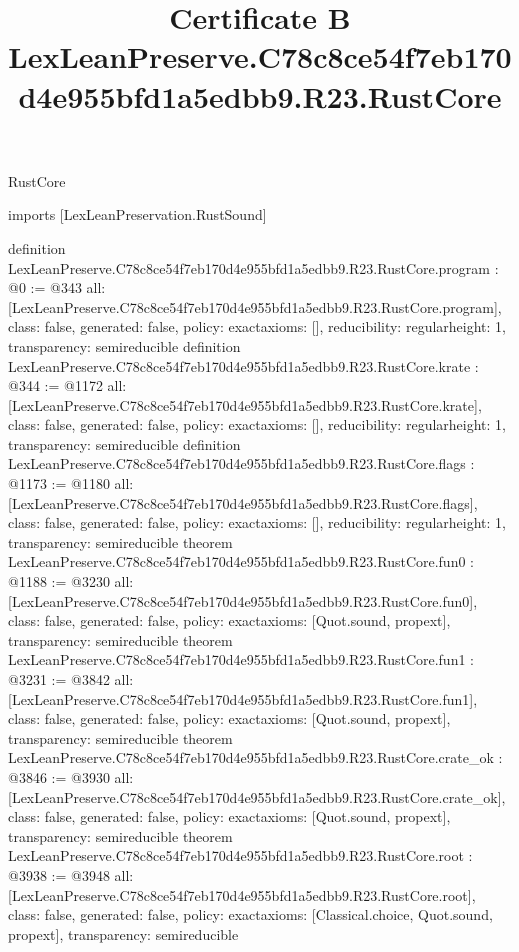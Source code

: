 \begin{lexlean}{RustCore}
\title{Certificate B LexLeanPreserve.C78c8ce54f7eb170d4e955bfd1a5edbb9.R23.RustCore}
\begin{coremodule}
imports [LexLeanPreservation.RustSound]

definition LexLeanPreserve.C78c8ce54f7eb170d4e955bfd1a5edbb9.R23.RustCore.program : @0 := @343 {
  all: [LexLeanPreserve.C78c8ce54f7eb170d4e955bfd1a5edbb9.R23.RustCore.program],
  class: false,
  generated: false,
  policy: exact{axioms: []},
  reducibility: regular{height: 1},
  transparency: semireducible
}
definition LexLeanPreserve.C78c8ce54f7eb170d4e955bfd1a5edbb9.R23.RustCore.krate : @344 := @1172 {
  all: [LexLeanPreserve.C78c8ce54f7eb170d4e955bfd1a5edbb9.R23.RustCore.krate],
  class: false,
  generated: false,
  policy: exact{axioms: []},
  reducibility: regular{height: 1},
  transparency: semireducible
}
definition LexLeanPreserve.C78c8ce54f7eb170d4e955bfd1a5edbb9.R23.RustCore.flags : @1173 := @1180 {
  all: [LexLeanPreserve.C78c8ce54f7eb170d4e955bfd1a5edbb9.R23.RustCore.flags],
  class: false,
  generated: false,
  policy: exact{axioms: []},
  reducibility: regular{height: 1},
  transparency: semireducible
}
theorem LexLeanPreserve.C78c8ce54f7eb170d4e955bfd1a5edbb9.R23.RustCore.fun0 : @1188 := @3230 {
  all: [LexLeanPreserve.C78c8ce54f7eb170d4e955bfd1a5edbb9.R23.RustCore.fun0],
  class: false,
  generated: false,
  policy: exact{axioms: [Quot.sound, propext]},
  transparency: semireducible
}
theorem LexLeanPreserve.C78c8ce54f7eb170d4e955bfd1a5edbb9.R23.RustCore.fun1 : @3231 := @3842 {
  all: [LexLeanPreserve.C78c8ce54f7eb170d4e955bfd1a5edbb9.R23.RustCore.fun1],
  class: false,
  generated: false,
  policy: exact{axioms: [Quot.sound, propext]},
  transparency: semireducible
}
theorem LexLeanPreserve.C78c8ce54f7eb170d4e955bfd1a5edbb9.R23.RustCore.crate_ok : @3846 := @3930 {
  all: [LexLeanPreserve.C78c8ce54f7eb170d4e955bfd1a5edbb9.R23.RustCore.crate_ok],
  class: false,
  generated: false,
  policy: exact{axioms: [Quot.sound, propext]},
  transparency: semireducible
}
theorem LexLeanPreserve.C78c8ce54f7eb170d4e955bfd1a5edbb9.R23.RustCore.root : @3938 := @3948 {
  all: [LexLeanPreserve.C78c8ce54f7eb170d4e955bfd1a5edbb9.R23.RustCore.root],
  class: false,
  generated: false,
  policy: exact{axioms: [Classical.choice, Quot.sound, propext]},
  transparency: semireducible
}


\end{coremodule}
\end{lexlean}
